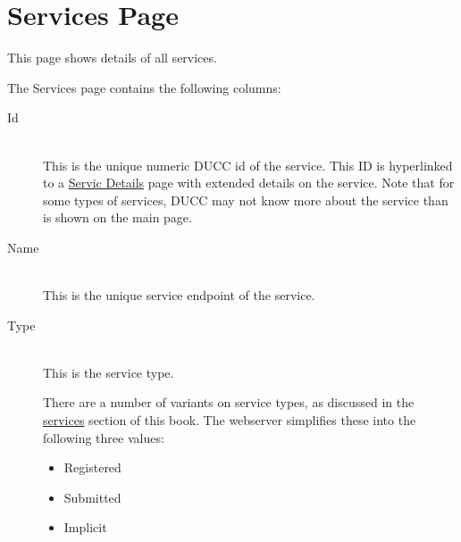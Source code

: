 
    \section{Services Page}

        This page shows details of all services.           

        The Services page contains the following columns: 
        \begin{description}

            \item[Id] \hfill \\
              This is the unique numeric DUCC id of the service.  This ID is hyperlinked to a
              \hyperref[sec:ws-service-details]{Servic Details} page with extended
              details on the service.  Note that for some types of services, DUCC may not
              know more about the service than is shown on the main page.

            \item[Name] \hfill \\
              This is the unique service endpoint of the service.  
              
            \item[Type] \hfill \\
              This is the service type.
              
              There are a number of variants on service types, as discussed in the
              \hyperref[sec:services.types]{services} section of this book.  The webserver
              simplifies these into the following three values:
              \begin{itemize}
                \item Registered
                \item Submitted
                \item Implicit
              \end{itemize}
              

\end{description}
